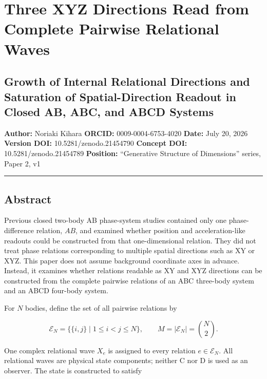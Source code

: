 \documentclass[
  10pt,
  a4paper,
]{article}
\author{}
\date{}
\begin{document}
\section{Three XYZ Directions Read from Complete Pairwise Relational
Waves}\label{three-xyz-directions-read-from-complete-pairwise-relational-waves}

\subsection{Growth of Internal Relational Directions and Saturation of
Spatial-Direction Readout in Closed AB, ABC, and ABCD
Systems}\label{growth-of-internal-relational-directions-and-saturation-of-spatial-direction-readout-in-closed-ab-abc-and-abcd-systems}

\textbf{Author:} Noriaki Kihara \textbf{ORCID:} 0009-0004-6753-4020
\textbf{Date:} July 20, 2026 \textbf{Version DOI:}
10.5281/zenodo.21454790 \textbf{Concept DOI:} 10.5281/zenodo.21454789
\textbf{Position:} ``Generative Structure of Dimensions'' series, Paper
2, v1

\begin{center}\rule{0.5\linewidth}{0.5pt}\end{center}

\subsection{Abstract}\label{abstract}

Previous closed two-body AB phase-system studies contained only one
phase-difference relation, \(AB\), and examined whether position and
acceleration-like readouts could be constructed from that
one-dimensional relation. They did not treat phase relations
corresponding to multiple spatial directions such as XY or XYZ. This
paper does not assume background coordinate axes in advance. Instead, it
examines whether relations readable as XY and XYZ directions can be
constructed from the complete pairwise relations of an ABC three-body
system and an ABCD four-body system.

For \(N\) bodies, define the set of all pairwise relations by

\[
\mathcal E_N
=
\bigl\{\{i,j\}\mid 1\le i<j\le N\bigr\},
\qquad
M=\lvert\mathcal E_N\rvert=\binom{N}{2}.
\]

One complex relational wave \(X_e\) is assigned to every relation
\(e\in\mathcal E_N\). All relational waves are physical state
components; neither C nor D is used as an observer. The state is
constructed to satisfy
\end{document}
